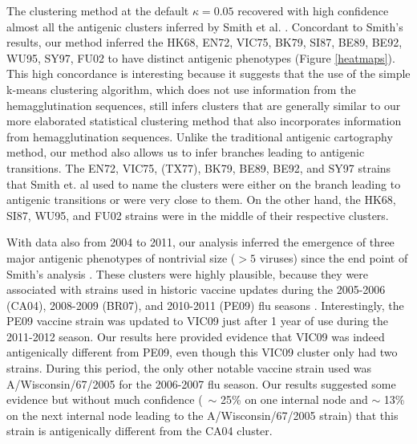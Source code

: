 \documentclass[11pt,oneside,letterpaper]{article}
\begin{document}
The clustering method at the default $\kappa=0.05$ recovered with high confidence almost all the  antigenic clusters inferred by Smith et al. \cite{smith_mapping_2004}. 
Concordant to Smith's results, our method inferred the HK68, EN72, VIC75, BK79, SI87, BE89, BE92, WU95, SY97, FU02 to have distinct antigenic phenotypes (Figure \ref{heatmaps}). %
This high concordance is interesting because it suggests that the use of the simple k-means clustering algorithm, which does not use information from the hemagglutination sequences, still infers clusters that are generally similar to our more elaborated statistical clustering method that also incorporates information from hemagglutination sequences.  %
Unlike the traditional antigenic cartography method, our method also allows us to infer branches leading to antigenic transitions.
The EN72, VIC75, (TX77), BK79, BE89, BE92, and SY97 strains that Smith et. al used to name the clusters were either on the branch leading to antigenic transitions or were very close to them.
On the other hand, the HK68, SI87, WU95, and FU02 strains were in the middle of their respective clusters. 

With data also from 2004 to 2011, our analysis inferred the emergence of three major antigenic phenotypes of nontrivial size ($>5$ viruses) since the end point of Smith's analysis \cite{smith_mapping_2004}.  
These clusters were highly plausible, because they were associated with strains used in historic vaccine updates during the 2005-2006 (CA04), 2008-2009 (BR07), and 2010-2011 (PE09) flu seasons \cite{WHO VACCINE REPORT}. 
Interestingly, the PE09 vaccine strain was updated to VIC09 just after 1 year of use during the 2011-2012 season. 
Our results here provided evidence that VIC09 was indeed antigenically different from PE09, even though this VIC09 cluster only had two strains.
During this period, the only other notable vaccine strain used was A/Wisconsin/67/2005 for the 2006-2007 flu season.
Our results suggested some evidence but without much confidence (~$\sim$ 25\% on one internal node and $\sim$ 13\% on the next internal node leading to the A/Wisconsin/67/2005 strain) that this strain is antigenically different from the CA04 cluster.
\end{document}
